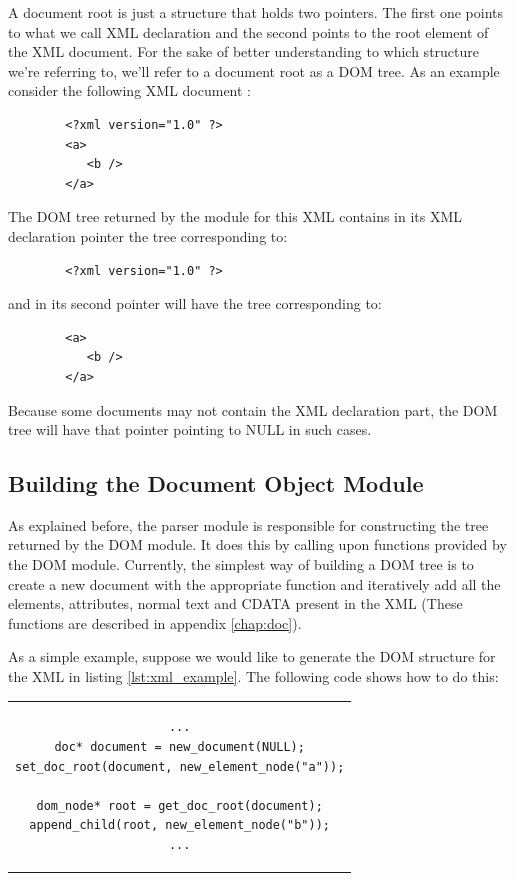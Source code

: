 \documentclass[a4paper]{report}
\begin{document}
	\pagebreak
	A document root is just a structure that holds two pointers. The first one points to what we call XML declaration and the second points to the root element of the XML document. For the sake of better understanding to which structure we're referring to, we'll refer to a document root as a DOM tree. As an example consider the following XML document	:

	\lstset{language=XML,caption=Sample XML file, captionpos=b}
	\begin{lstlisting}
		<?xml version="1.0" ?>
		<a>
		   <b />
		</a>
	\end{lstlisting}

	The DOM tree returned by the module for this XML contains in its XML declaration pointer the tree corresponding to:
	\lstset{language=XML,caption=Sample XML declaration, captionpos=b}
	\begin{lstlisting}
		<?xml version="1.0" ?>
	\end{lstlisting}

	and in its second pointer will have the tree corresponding to:
	\label{lst:xml_example}
	\lstset{language=XML,caption=Sample XML file without XML declaration, captionpos=b}
	\begin{lstlisting}
		<a>
		   <b />
		</a>
	\end{lstlisting}

	Because some documents may not contain the XML declaration part, the DOM tree will have that pointer pointing to NULL in such cases.

	\subsection{Building the Document Object Module}
		As explained before, the parser module is responsible for constructing the tree returned by the DOM module. It does this by calling upon functions provided by the DOM module. Currently, the simplest way of building a DOM tree is to create a new document with the appropriate function and iteratively add all the elements, attributes, normal text and CDATA present in the XML (These functions are described in appendix	\ref{chap:doc}).

		As a simple example, suppose we would like to generate the DOM structure for the XML in listing \ref{lst:xml_example}. The following code shows how to do this:

	\begin{center}
	\lstset{language=C,numbers=left, captionpos=b, caption=Sample code to build a DOM tree.}
		\begin{tabular}{c}
	\begin{lstlisting}
...
doc* document = new_document(NULL);
set_doc_root(document, new_element_node("a"));

dom_node* root = get_doc_root(document);
append_child(root, new_element_node("b"));
...
	\end{lstlisting}
	\end{tabular}
	\end{center}
\end{document}
